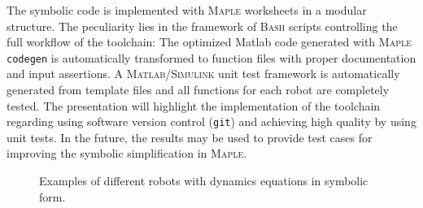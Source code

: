 \documentclass[runningheads]{llncs}
\begin{document}
The symbolic code is implemented with \textsc{Maple} worksheets in a modular structure.
The peculiarity lies in the framework of \textsc{Bash} scripts controlling the full workflow of the toolchain:
The optimized Matlab code generated with \textsc{Maple} \texttt{codegen} is automatically transformed to function files with proper documentation and input assertions.
A \textsc{Matlab/Simulink} unit test framework is automatically generated from template files and all functions for each robot are completely tested.
The presentation will highlight the implementation of the toolchain regarding using software version control (\texttt{git}) and achieving high quality by using unit tests.
In the future, the results may be used to provide test cases for improving the symbolic simplification in \textsc{Maple}.

\begin{figure}[htb]
	
	\caption{Examples of different robots with dynamics equations in symbolic form.}
	\label{fig:robot_examples}
\end{figure} 

%
%
%
%
%
\end{document}
